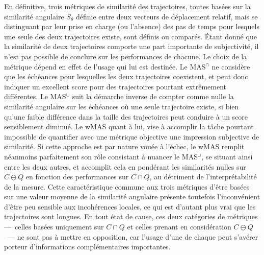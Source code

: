 \documentclass[../main.tex]{subfiles}
\begin{document}
En définitive, trois métriques de similarité des trajectoires, toutes basées sur la similarité angulaire $S_\theta$ définie entre deux vecteurs de déplacement
relatif, mais se distinguant par leur prise en charge (ou l'absence) des pas de temps pour lesquels une seule des deux trajectoires existe, sont définis ou
comparés. Étant donné que la similarité de deux trajectoires comporte une part importante de subjectivité, il n'est pas possible de conclure sur les
performances de chacune. Le choix de la métrique dépend en effet de l'usage qui lui est destinée. Le MAS$^\cap$ ne considère que les échéances pour lesquelles
les deux trajectoires coexistent, et peut donc indiquer un excellent score pour des trajectoires pourtant extrêmement différentes. Le MAS$^\cup$ suit la
démarche inverse de compter comme nulle la similarité angulaire sur les échéances où une seule trajectoire existe, si bien qu'une faible différence dans la
taille des trajectoires peut conduire à un score sensiblement diminué. Le wMAS quant à lui, vise à accomplir la tâche pourtant impossible de quantifier avec une
métrique objective une impression subjective de similarité. Si cette approche est par nature vouée à l'échec, le wMAS remplit néanmoins parfaitement son rôle
consistant à nuancer le MAS$^\cup$, se situant ainsi entre les deux autres, et accomplit cela en pondérant les similarités nulles sur $C \ominus Q$ en fonction des
performances sur $C \cap Q$, au détriment de l'interprétabilité de la mesure. Cette caractéristique commune aux trois métriques d'être basées sur une valeur moyenne de
la similarité angulaire présente toutefois l'inconvénient d'être peu sensible aux incohérences locales, ce qui est d'autant plus vrai que les trajectoires sont
longues. En tout état de cause, ces deux catégories de métriques ---~celles basées uniquement sur $C \cap Q$ et celles prenant en considération $C \ominus
Q$~--- ne sont pas à mettre en opposition, car l'usage d'une de chaque peut s'avérer porteur d'informations complémentaires importantes.
\end{document}
